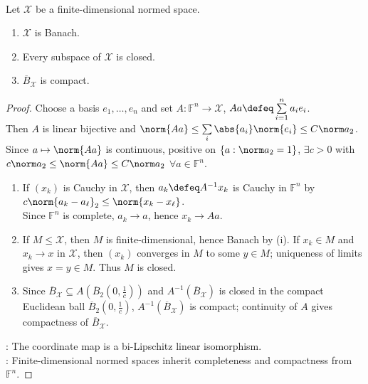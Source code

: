 \begin{theorem} \label{thm:finite-dimensional-normed-spaces} \\
Let $\mathcal{X}$ be a finite-dimensional normed space.
\begin{enumerate}[label=(\roman*)]
\setlength{\itemsep}{0pt}
\item $\mathcal{X}$ is Banach.
\item Every subspace of $\mathcal{X}$ is closed.
\item $\overline{B}_{\mathcal{X}}$ is compact.
\end{enumerate}
\begin{proof}
Choose a basis $e_1,\ldots,e_n$ and set $A:\mathbb F^n\to\mathcal X$, $Aa\defeq\sum\limits_{i=1}^{n}a_ie_i$.\\
Then $A$ is linear bijective and $\norm{Aa}\leq\sum\limits_i\abs{a_i}\norm{e_i}\leq C\norm a_2$.\\
Since $a\mapsto\norm{Aa}$ is continuous, positive on $\{a:\norm a_2=1\}$, $\exists c>0$ with $c\norm a_2\leq\norm{Aa}\leq C\norm a_2$ $\forall a\in\mathbb F^n$.
\begin{enumerate}[label=(\roman*)]
\setlength{\itemsep}{0pt}
\item If $(x_k)$ is Cauchy in $\mathcal X$, then $a_k\defeq A^{-1}x_k$ is Cauchy in $\mathbb F^n$ by $c\norm{a_k-a_\ell}_2\leq\norm{x_k-x_\ell}$.\\
Since $\mathbb F^n$ is complete, $a_k\to a$, hence $x_k\to Aa$.
\item If $M\leq\mathcal X$, then $M$ is finite-dimensional, hence Banach by (i). If $x_k\in M$ and $x_k\to x$ in $\mathcal X$, then $(x_k)$ converges in $M$ to some $y\in M$; uniqueness of limits gives $x=y\in M$. Thus $M$ is closed.
\item Since $\overline{B}_{\mathcal X}\subseteq A(\overline{B}_2(0,\frac{1}{c}))$ and $A^{-1}(\overline{B}_{\mathcal X})$ is closed in the compact Euclidean ball $\overline{B}_2(0,\frac{1}{c})$, $A^{-1}(\overline{B}_{\mathcal X})$ is compact; continuity of $A$ gives compactness of $\overline{B}_{\mathcal X}$.
\end{enumerate}
: The coordinate map is a bi-Lipschitz linear isomorphism.\\
: Finite-dimensional normed spaces inherit completeness and compactness from $\mathbb F^n$.
\end{proof}
\end{theorem}


